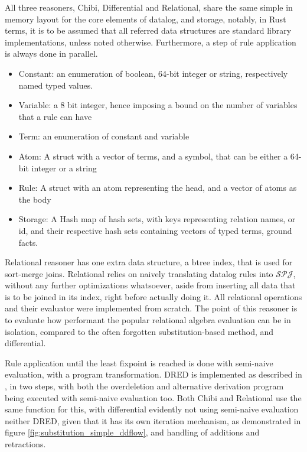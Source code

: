 \documentclass[sigconf,screen,review,natbib]{acmart}
\theoremstyle{definition}
\begin{document}
All three reasoners, Chibi, Differential and Relational, share the same simple in memory layout for the core elements of
datalog, and storage, notably, in Rust terms, it is to be assumed that all referred data structures are standard library
implementations, unless noted otherwise. Furthermore, a step of rule application is always done in parallel.
\begin{itemize}
	\item Constant: an enumeration of boolean, 64-bit integer or string, respectively named typed values.
	\item Variable: a 8 bit integer, hence imposing a bound on the number of variables that a rule can have
	\item Term: an enumeration of constant and variable
	\item Atom: A struct with a vector of terms, and a symbol, that can be either a 64-bit integer or a string
	\item Rule: A struct with an atom representing the head, and a vector of atoms as the body
	\item Storage: A Hash map of hash sets, with keys representing relation names, or id, and their respective
	      hash sets containing vectors of typed terms, ground facts.
\end{itemize}
Relational reasoner has one extra data structure, a btree index, that is used for sort-merge joins. Relational relies on
naively translating datalog rules into $\mathcal{SPJ}$, without any further optimizations whatsoever, aside from inserting
all data that is to be joined in its index, right before actually doing it. All relational operations and their evaluator
were implemented from scratch. The point of this reasoner is to evaluate how performant the popular relational algebra
evaluation can be in isolation, compared to the often forgotten substitution-based method, and differential.

Rule application until the least fixpoint is reached is done with semi-naive evaluation\cite{abiteboul}, with a program
transformation. DRED is implemented as described in \cite{dred}, in two steps, with both the overdeletion and alternative
derivation program being executed with semi-naive evaluation too. Both Chibi and Relational use the same function for this,
with differential evidently not using semi-naive evaluation neither DRED, given that it has its own iteration mechanism, as
demonstrated in figure \ref{fig:substitution_simple_ddflow}, and handling of additions and retractions.
\end{document}
